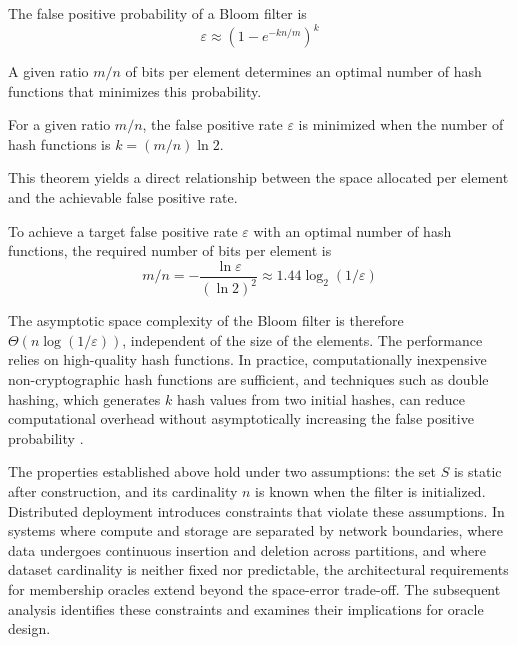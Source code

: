 \begin{proposition}
    The false positive probability of a Bloom filter is
    $$\varepsilon \approx (1 - e^{-kn/m})^k$$
\end{proposition}

A given ratio $m/n$ of bits per element determines an optimal number of hash functions that minimizes this probability.

\begin{theorem}
    For a given ratio $m/n$, the false positive rate $\varepsilon$ is minimized when the number of hash functions is $k = (m/n) \ln 2$.
\end{theorem}

This theorem yields a direct relationship between the space allocated per element and the achievable false positive rate.

\begin{corollary}
    To achieve a target false positive rate $\varepsilon$ with an optimal number of hash functions, the required number of bits per element is
    $$m/n = -\frac{\ln \varepsilon}{(\ln 2)^2} \approx 1.44 \log_2(1/\varepsilon)$$
\end{corollary}

The asymptotic space complexity of the Bloom filter is therefore $\Theta(n \log(1/\varepsilon))$, independent of the size of the elements. The performance relies on high-quality hash functions. In practice, computationally inexpensive non-cryptographic hash functions are sufficient, and techniques such as double hashing, which generates $k$ hash values from two initial hashes, can reduce computational overhead without asymptotically increasing the false positive probability \cite{Tarkoma2012TheoryAP}.

The properties established above hold under two assumptions: the set $S$ is static after construction, and its cardinality $n$ is known when the filter is initialized. Distributed deployment introduces constraints that violate these assumptions. In systems where compute and storage are separated by network boundaries, where data undergoes continuous insertion and deletion across partitions, and where dataset cardinality is neither fixed nor predictable, the architectural requirements for membership oracles extend beyond the space-error trade-off. The subsequent analysis identifies these constraints and examines their implications for oracle design.

